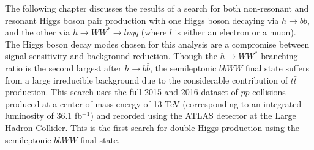 The following chapter discusses the results of a search for both non-resonant and resonant Higgs boson pair production with one Higgs boson decaying via $h \to b \bar{b}$, and the other via $h \to WW^{\ast} \to l\nu qq$ (where $l$ is either an electron or a muon). The Higgs boson decay modes chosen for this analysis are a compromise between signal sensitivity and background reduction. Though the $h \to WW^{\ast}$ branching ratio is the second largest after $h \to b \bar{b}$, the semileptonic $bbWW$ final state suffers from a large irreducible background due to the considerable contribution of $t \bar{t}$ production. This search uses the full 2015 and 2016 dataset of $pp$ collisions produced at a center-of-mass energy of 13 TeV (corresponding to an integrated luminosity of 36.1 fb$^{-1}$) and recorded using the ATLAS detector at the Large Hadron Collider. This is the first search for double Higgs production using the semileptonic $bbWW$ final state,



